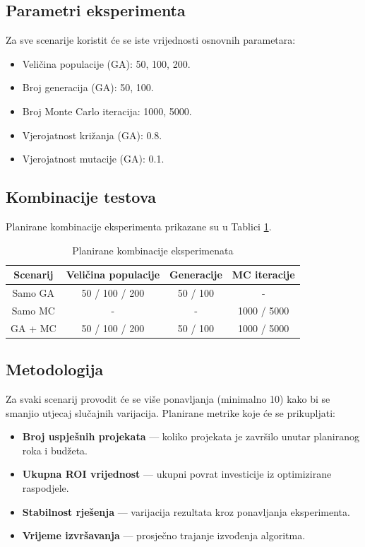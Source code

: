 \subsection{Parametri eksperimenta}
Za sve scenarije koristit će se iste vrijednosti osnovnih parametara:
\begin{itemize}
    \item Veličina populacije (GA): 50, 100, 200.
    \item Broj generacija (GA): 50, 100.
    \item Broj Monte Carlo iteracija: 1000, 5000.
    \item Vjerojatnost križanja (GA): 0.8.
    \item Vjerojatnost mutacije (GA): 0.1.
\end{itemize}

\subsection{Kombinacije testova}
Planirane kombinacije eksperimenta prikazane su u Tablici \ref{tab:test_kombinacije}.

\begin{table}[H]
\centering
\caption{Planirane kombinacije eksperimenata}
\label{tab:test_kombinacije}
\begin{tabular}{|c|c|c|c|}
\hline
\textbf{Scenarij} & \textbf{Veličina populacije} & \textbf{Generacije} & \textbf{MC iteracije} \\ \hline
Samo GA & 50 / 100 / 200 & 50 / 100 & - \\ \hline
Samo MC & - & - & 1000 / 5000 \\ \hline
GA + MC & 50 / 100 / 200 & 50 / 100 & 1000 / 5000 \\ \hline
\end{tabular}
\end{table}

\subsection{Metodologija}
Za svaki scenarij provodit će se više ponavljanja (minimalno 10) kako bi se smanjio utjecaj slučajnih varijacija.  
Planirane metrike koje će se prikupljati:
\begin{itemize}
    \item \textbf{Broj uspješnih projekata} — koliko projekata je završilo unutar planiranog roka i budžeta.
    \item \textbf{Ukupna ROI vrijednost} — ukupni povrat investicije iz optimizirane raspodjele.
    \item \textbf{Stabilnost rješenja} — varijacija rezultata kroz ponavljanja eksperimenta.
    \item \textbf{Vrijeme izvršavanja} — prosječno trajanje izvođenja algoritma.
\end{itemize}


